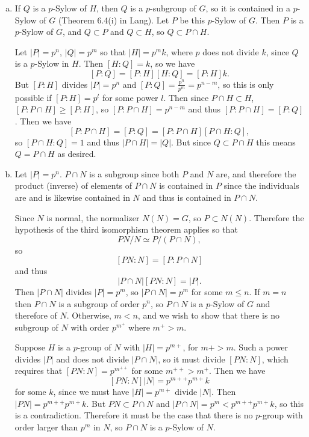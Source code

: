 \documentclass{article}
\begin{document}
\begin{Answer}
\begin{enumerate}[(a)]
  \item{
    If $Q$ is a $p$-Sylow of $H$, then $Q$ is a $p$-subgroup of $G$,
    so it is contained in a $p$-Sylow of $G$ (Theorem 6.4(i) in Lang).
    Let $P$ be this $p$-Sylow of $G$. Then $P$ is a $p$-Sylow of $G$,
    and $Q \subset P$ and $Q \subset H$, so $Q \subset P \cap H$.

    Let $|P| = p^n$, $|Q| = p^m$ so that $|H| = p^m k$, 
    where $p$ does not divide $k$, 
    since $Q$ is a $p$-Sylow in $H$. Then $[H : Q] = k$, so we have
    $$
    [P : Q] = [P : H][H : Q] = [P : H]k.
    $$
    But $[P : H]$ divides $|P| = p^n$ and 
    $[P : Q] = \frac{p^n}{p^m} = p^{n - m}$, so this is only possible
    if $[P : H] = p^l$ for some power $l$. Then since
    $P \cap H \subset H$, 
    $[P : P \cap H] \geq [P : H]$, so $[P : P \cap H] = p^{n - m}$
    and thus $[P : P \cap H] = [P : Q]$. Then we have
    $$
    [P : P \cap H] = [P : Q] = [P : P \cap H] [P \cap H : Q],
    $$
    so $[P \cap H : Q] = 1$ and thus $|P \cap H| = |Q|$. But since
    $Q \subset P \cap H$ this means $Q = P \cap H$ as desired.
  }
  \item{
    Let $|P| = p^n$. $P \cap N$ is a subgroup since both $P$ and $N$
    are, and therefore the product (inverse) of elements of $P \cap N$ is
    contained in $P$ since the individuals are and is likewise
    contained in $N$ and thus is contained in $P \cap N$.

    Since $N$ is normal, the normalizer $N(N) = G$, so $P \subset
    N(N)$. Therefore the hypothesis of the third isomorphism theorem
    applies so that
    $$
    PN / N \simeq P / (P \cap N),
    $$
    so
    $$
    [PN : N] = [P : P \cap N]
    $$
    and thus
    $$
    |P \cap N| [PN : N] = |P|.
    $$
    Then $|P \cap N|$ divides $|P| = p^m$, so $|P \cap N| = p^m$ for
    some $m \leq n$. If $m = n$ then $P \cap N$ is a subgroup of order
    $p^n$, so $P \cap N$ is a $p$-Sylow of $G$ and therefore of
    $N$. Otherwise, $m < n$, and we wish to show that there is no
    subgroup of $N$ with order $p^{m^+}$ where $m^+ > m$. 

    Suppose $H$ is a $p$-group of $N$ with $|H| = p^{m+}$, for
    $m+ > m$. Such a power
    divides $|P|$ and does not divide $|P \cap N|$, so it must divide
    $[PN : N]$, which requires that $[PN : N] = p^{m^{++}}$ for some
    $m^{++} > m^+$. Then we have
    $$
    [PN : N] |N| = p^{m++} p^{m+} k
    $$
    for some $k$, since we must have $|H| = p^{m+}$ divide $|N|$.
    Then $|PN| = p^{m++}p^{m+} k$. But $PN \subset P \cap N$ and
    $|P \cap N| = p^m < p^{m++}p^{m+} k$, so this is a
    contradiction. Therefore it must be the case that there is no
    $p$-group with order larger than $p^m$ in $N$, so $P \cap N$ is a
    $p$-Sylow of $N$.

}
\end{enumerate}
\end{Answer}
\end{document}
